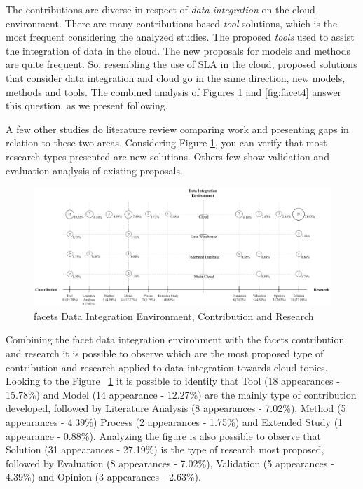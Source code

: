 The contributions are diverse in respect of \textit{data integration} on the
cloud environment. There are many contributions based \textit{tool} solutions,
which is the most frequent considering the analyzed studies. The
proposed \textit{tools} used to assist the integration of data in the cloud.
The new proposals for models and methods are quite frequent. So, resembling the
use of SLA in the cloud, proposed solutions that consider data integration and
cloud go in the same direction, new models, methods and tools. The combined
analysis of Figures \ref{fig:facet2} and \ref{fig:facet4} answer this question,
as we present following.


A few other studies do literature review comparing work and presenting
gaps in relation to these two areas. Considering Figure \ref{fig:facet2}, you
can verify that most research types presented are new solutions. Others few show validation
and evaluation ana;lysis of existing proposals.     

\begin{figure}[h]
\centering
\includegraphics[scale=0.48]{figs/bubble-charts/DI-Environment-Contribution-Research.pdf}
\caption{facets Data Integration Environment, Contribution and Research}\label{fig:facet2}
\end{figure}

Combining the facet data integration environment with the facets contribution
and research it is possible to observe which are the most proposed type of
contribution and research applied to data integration towards cloud topics. 
Looking to the Figure ~\ref{fig:facet2} it is possible to identify that Tool (18
appearances - 15.78\%) and Model (14 appearance - 12.27\%) are the mainly type
of contribution developed, followed by Literature Analysis (8 appearances -
7.02\%), Method (5 appearances - 4.39\%) Process (2 appearances - 1.75\%) and
Extended Study (1 appearance - 0.88\%).
Analyzing the figure is also possible to observe that Solution (31 appearances -
27.19\%) is the type of research most proposed, followed by Evaluation (8
appearances - 7.02\%), Validation (5 appearances - 4.39\%) and Opinion (3
appearances - 2.63\%).
 
